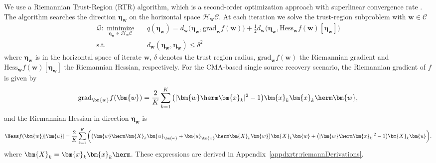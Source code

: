 We use a Riemannian Trust-Region (RTR) algorithm, which is a second-order optimization approach with superlinear convergence rate \cite{Absil2007trustregions}. The algorithm searches the direction $\bm{\eta}_{\bm{w}}$ on the horizontal space $\mathcal{H}_{\bm{w}}\mathcal{C}$. At each iteration we solve the trust-region subproblem with $\bm{w}\in\mathcal{C}$ 
\begin{eqnarray}
\mathcal{Q}:\,\,\underset{\bm{\eta}_{\bm{w}}\in\mathcal{H}_{\bm{w}}\mathcal{C}}{\text{minimize}}\quad& q(\bm{\eta}_{\bm{w}})=d_{\bm{w}}\big(\bm{\eta}_{\bm{w}},\text{grad}_{\bm{w}}f(\bm{w})\big)+\frac{1}{2}d_{\bm{w}}\big(\bm{\eta}_{\bm{w}},\text{Hess}_{\bm{w}}f(\bm{w})[\bm{\eta}_{\bm{w}}]\big)\nonumber\\
\text{s.t.}\quad&d_{\bm{w}}(\bm{\eta}_{\bm{w}},\bm{\eta}_{\bm{w}})\leq\delta^2
\end{eqnarray}
where $\bm{\eta}_{\bm{w}}$ is in the horizontal space of iterate $\bm{w}$, $\delta$ denotes the trust region radius, 
$\text{grad}_{\bm{w}}f(\bm{w})$ the Riemannian gradient and $\text{Hess}_{\bm{w}}f(\bm{w})[\bm{\eta}_{\bm{w}}]$ the Riemannian Hessian, respectively. 
For the CMA-based single source recovery scenario, the Riemannian gradient of $f$ is given by
\begin{align}
\mathrm{grad}_{\bm{w}}f(\bm{w})=\frac{2}{K}\sum_{k=1}^K \big(|\bm{w}\herm\bm{x}_k|^2-1\big)\bm{x}_k\bm{x}_k\herm\bm{w}, \label{eqn:rtrgradient}
\end{align}
and the Riemannian Hessian in direction $\bm{\eta}_{\bm{w}}$ is
\begin{align}
\Hess f(\bm{w})[\bm{u}]=\frac{2}{K}\sum_{k=1}^K\bigg( \big(\bm{w}\herm\bm{X}_k\bm{u}_{\bm{w}}+\bm{u}_{\bm{w}}\herm\bm{X}_k\bm{w}\big)\bm{X}_k\bm{w} +\big(|\bm{w}\herm\bm{x}_k|^2-1\big)\bm{X}_k\bm{u}\bigg).\label{eqn:rtrhessian}
\end{align}
where $\bm{X}_k=\bm{x}_k\bm{x}_k\herm$. These expressions are derived in Appendix~\ref{appdxrtr:riemannDerivations}.

